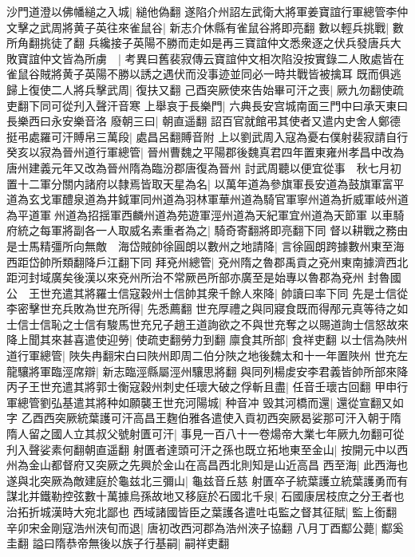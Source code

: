 沙門道澄以佛幡縋之入城|{
	縋他偽翻}
遂陷介州詔左武衛大將軍姜寶誼行軍總管李仲文擊之武周將黄子英往來雀鼠谷|{
	新志介休縣有雀鼠谷將即亮翻}
數以輕兵挑戰|{
	數所角翻挑徒了翻}
兵纔接子英陽不勝而走如是再三寶誼仲文悉衆逐之伏兵發唐兵大敗寶誼仲文皆為所虜　|{
	考異曰舊裴寂傳云寶誼仲文相次陷没按實錄二人敗處皆在雀鼠谷賊將黄子英陽不勝以誘之遇伏而没事迹並同必一時共戰皆被擒耳}
既而俱逃歸上復使二人將兵擊武周|{
	復扶又翻}
己酉突厥使來告始畢可汗之喪|{
	厥九勿翻使疏吏翻下同可從刋入聲汗音寒}
上舉哀于長樂門|{
	六典長安宫城南面三門中曰承天東曰長樂西曰永安樂音洛}
廢朝三曰|{
	朝直遥翻}
詔百官就館弔其使者又遣内史舍人鄭德挺弔處羅可汗賻帛三萬段|{
	處昌呂翻賻音附}
上以劉武周入寇為憂右僕射裴寂請自行癸亥以寂為晉州道行軍總管|{
	晉州曹魏之平陽郡後魏真君四年置東雍州孝昌中改為唐州建義元年又改為晉州隋為臨汾郡唐復為晉州}
討武周聽以便宜從事　秋七月初置十二軍分關内諸府以隸焉皆取天星為名|{
	以萬年道為參旗軍長安道為鼓旗軍富平道為玄戈軍醴泉道為井鉞軍同州道為羽林軍華州道為騎官軍寧州道為折威軍岐州道為平道軍州道為招揺軍西麟州道為苑遊軍涇州道為天紀軍宜州道為天節軍}
以車騎府統之每軍將副各一人取威名素重者為之|{
	騎奇寄翻將即亮翻下同}
督以耕戰之務由是士馬精彊所向無敵　海岱賊帥徐圓朗以數州之地請降|{
	言徐圓朗跨據數州東至海西距岱帥所類翻降戶江翻下同}
拜兗州總管|{
	兗州隋之魯郡禹貢之兗州東南據濟西北距河封域廣矣後漢以來兗州所治不常厥邑所部亦廣至是始專以魯郡為兗州}
封魯國公　王世充遣其將羅士信寇穀州士信帥其衆千餘人來降|{
	帥讀曰率下同}
先是士信從李密擊世充兵敗為世充所得|{
	先悉薦翻}
世充厚禮之與同寢食既而得邴元真等待之如士信士信恥之士信有駿馬世充兄子趙王道詢欲之不與世充奪之以賜道詢士信怒故來降上聞其來甚喜遣使迎勞|{
	使疏吏翻勞力到翻}
廪食其所部|{
	食祥吏翻}
以士信為陜州道行軍總管|{
	陜失冉翻宋白曰陜州即周二伯分陜之地後魏太和十一年置陜州}
世充左龍驤將軍臨涇席辯|{
	新志臨涇縣屬涇州驤思將翻}
與同列楊䖍安李君義皆帥所部來降　丙子王世充遣其將郭士衡寇穀州刺史任瓌大破之俘斬且盡|{
	任音壬瓌古回翻}
甲申行軍總管劉弘基遣其將种如願襲王世充河陽城|{
	种音冲}
毁其河橋而還|{
	還從宣翻又如字}
乙酉西突厥統葉護可汗高昌王麴伯雅各遣使入貢初西突厥曷娑那可汗入朝于隋隋人留之國人立其叔父號射匱可汗|{
	事見一百八十一卷煬帝大業七年厥九勿翻可從刋入聲娑素何翻朝直遥翻}
射匱者達頭可汗之孫也既立拓地東至金山|{
	按開元中以西州為金山都督府又突厥之先興於金山在高昌西北則知是山近高昌}
西至海|{
	此西海也}
遂與北突厥為敵建庭於龜兹北三彌山|{
	龜兹音丘慈}
射匱卒子統葉護立統葉護勇而有謀北并鐵勒控弦數十萬據烏孫故地又移庭於石國北千泉|{
	石國康居枝庶之分王者也治拓折城漢時大宛北鄙也}
西域諸國皆臣之葉護各遣吐屯監之督其征賦|{
	監上銜翻}
辛卯宋金剛寇浩州浹旬而退|{
	唐初改西河郡為浩州浹子協翻}
八月丁酉酅公薨|{
	酅奚圭翻}
謚曰隋恭帝無後以族子行基嗣|{
	嗣祥吏翻}
